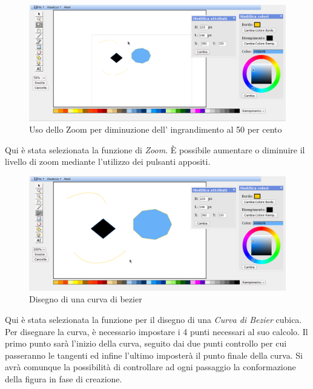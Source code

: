 \begin{figure}[!ht]
\centering
\includegraphics[scale=0.4]{images/zoom_meno.png}
\caption{Uso dello Zoom per diminuzione dell' ingrandimento al 50 per cento}
\end{figure} 

\vspace{100pt}
Qui \`e stata selezionata la funzione di \textit{Zoom}. \`E possibile aumentare o diminuire il livello di zoom mediante l'utilizzo dei pulsanti appositi.
 
\begin{figure}[!ht]
\centering
\includegraphics[scale=0.4]{images/bezier.png}
\caption{Disegno di una curva di bezier}
\end{figure} 

\vspace{100pt}
Qui \`e stata selezionata la funzione per il disegno di una \textit{Curva di Bezier} cubica. Per disegnare la curva, \` e necessario impostare i 4 punti necessari al suo calcolo. Il primo punto sar\`a l'inizio della curva, seguito dai due punti controllo per cui passeranno le tangenti ed infine l'ultimo imposter\` a il punto finale della curva. Si avr\` a comunque la possibilit\` a di controllare ad ogni passaggio la conformazione della figura in fase di creazione.

